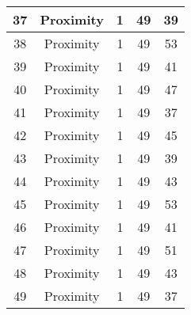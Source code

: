 \documentclass[results.tex]{subfiles}
\begin{document}
\begin{center}
\begin{tabular}{| c || c | c | c | c |}
            \hline
            37                      & Proximity                    & 1                      & 49                      & 39                   \\
            \hline
            38                      & Proximity                    & 1                      & 49                      & 53                   \\
            \hline
            39                      & Proximity                    & 1                      & 49                      & 41                   \\
            \hline
            40                      & Proximity                    & 1                      & 49                      & 47                   \\
            \hline
            41                      & Proximity                    & 1                      & 49                      & 37                   \\
            \hline
            42                      & Proximity                    & 1                      & 49                      & 45                   \\
            \hline
            43                      & Proximity                    & 1                      & 49                      & 39                   \\
            \hline
            44                      & Proximity                    & 1                      & 49                      & 43                   \\
            \hline
            45                      & Proximity                    & 1                      & 49                      & 53                   \\
            \hline
            46                      & Proximity                    & 1                      & 49                      & 41                   \\
            \hline
            47                      & Proximity                    & 1                      & 49                      & 51                   \\
            \hline
            48                      & Proximity                    & 1                      & 49                      & 43                   \\
            \hline
            49                      & Proximity                    & 1                      & 49                      & 37                   \\
            \hline
        \end{tabular}
    \end{center}
\end{document}
